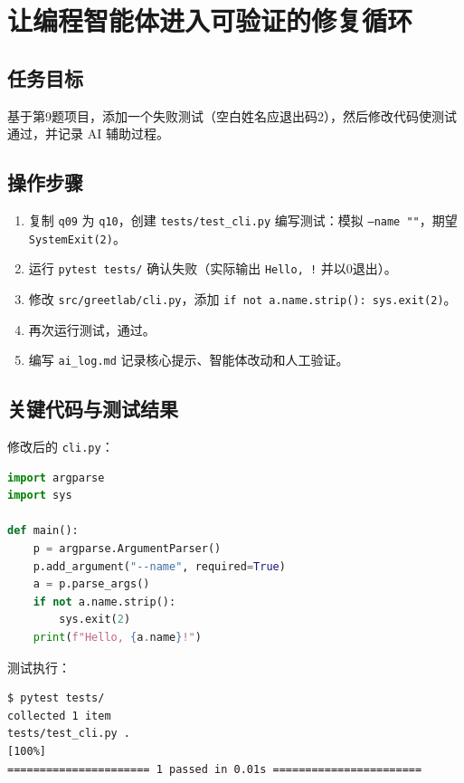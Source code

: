 \documentclass[12pt,a4paper]{ctexart}
\begin{document}
\newpage

\section{让编程智能体进入可验证的修复循环}

\subsection{任务目标}
基于第9题项目，添加一个失败测试（空白姓名应退出码2），然后修改代码使测试通过，并记录 AI 辅助过程。

\subsection{操作步骤}
\begin{enumerate}
    \item 复制 \texttt{q09} 为 \texttt{q10}，创建 \texttt{tests/test\_cli.py} 编写测试：模拟 \texttt{--name ""}，期望 \texttt{SystemExit(2)}。
    \item 运行 \texttt{pytest tests/} 确认失败（实际输出 \texttt{Hello, !} 并以0退出）。
    \item 修改 \texttt{src/greetlab/cli.py}，添加 \texttt{if not a.name.strip(): sys.exit(2)}。
    \item 再次运行测试，通过。
    \item 编写 \texttt{ai\_log.md} 记录核心提示、智能体改动和人工验证。
\end{enumerate}

\subsection{关键代码与测试结果}
修改后的 \texttt{cli.py}：
\begin{lstlisting}[language=python]
import argparse
import sys

def main():
    p = argparse.ArgumentParser()
    p.add_argument("--name", required=True)
    a = p.parse_args()
    if not a.name.strip():
        sys.exit(2)
    print(f"Hello, {a.name}!")
\end{lstlisting}

测试执行：
\begin{lstlisting}
$ pytest tests/
collected 1 item
tests/test_cli.py .                                              [100%]
====================== 1 passed in 0.01s =======================
\end{lstlisting}
\end{document}
